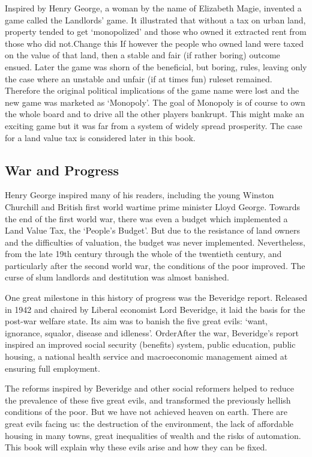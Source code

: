 \documentclass[]{tufte-handout}
\begin{document}
Inspired by Henry George, a woman by the name of Elizabeth Magie,
invented a game called the Landlords' game. It illustrated that without
a tax on urban land, property tended to get `monopolized' and those who
owned it extracted rent from those who did not.Change this If however
the people who owned land were taxed on the value of that land, then a
stable and fair (if rather boring) outcome ensued. Later the game was
shorn of the beneficial, but boring, rules, leaving only the case where
an unstable and unfair (if at times fun) ruleset remained. Therefore the
original political implications of the game name were lost and the new
game was marketed as `Monopoly'. The goal of Monopoly is of course to
own the whole board and to drive all the other players bankrupt. This
might make an exciting game but it was far from a system of widely
spread prosperity. The case for a land value tax is considered later in
this book.

\hypertarget{war-and-progress}{%
\subsection{War and Progress}\label{war-and-progress}}

Henry George inspired many of his readers, including the young Winston
Churchill and British first world wartime prime minister Lloyd George.
Towards the end of the first world war, there was even a budget which
implemented a Land Value Tax, the `People's Budget'. But due to the
resistance of land owners and the difficulties of valuation, the budget
was never implemented. Nevertheless, from the late 19th century through
the whole of the twentieth century, and particularly after the second
world war, the conditions of the poor improved. The curse of slum
landlords and destitution was almost banished.

One great milestone in this history of progress was the Beveridge
report. Released in 1942 and chaired by Liberal economist Lord
Beveridge, it laid the basis for the post-war welfare state. Its aim was
to banish the five great evils: `want, ignorance, squalor, disease and
idleness'. OrderAfter the war, Beveridge's report inspired an improved
social security (benefits) system, public education, public housing, a
national health service and macroeconomic management aimed at ensuring
full employment.

The reforms inspired by Beveridge and other social reformers helped to
reduce the prevalence of these five great evils, and transformed the
previously hellish conditions of the poor. But we have not achieved
heaven on earth. There are great evils facing us: the destruction of the
environment, the lack of affordable housing in many towns, great
inequalities of wealth and the risks of automation. This book will
explain why these evils arise and how they can be fixed.
\end{document}
